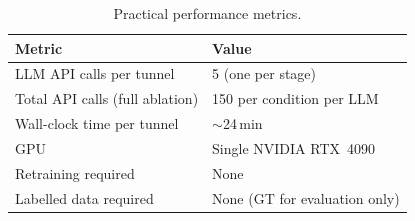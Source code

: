 \documentclass[a4paper,fleqn]{cas-dc}
\begin{document}
\begin{table}[ht]
\caption{Practical performance metrics.}\label{tab:practical}
\begin{tabular*}{\tblwidth}{@{} l l @{}}
\toprule
Metric & Value \\
\midrule
LLM API calls per tunnel & 5 (one per stage) \\
Total API calls (full ablation) & 150 per condition per LLM \\
Wall-clock time per tunnel & $\sim$24\,min \\
GPU & Single NVIDIA RTX~4090 \\
Retraining required & None \\
Labelled data required & None (GT for evaluation only) \\
\bottomrule
\end{tabular*}
\end{table}




\end{document}
